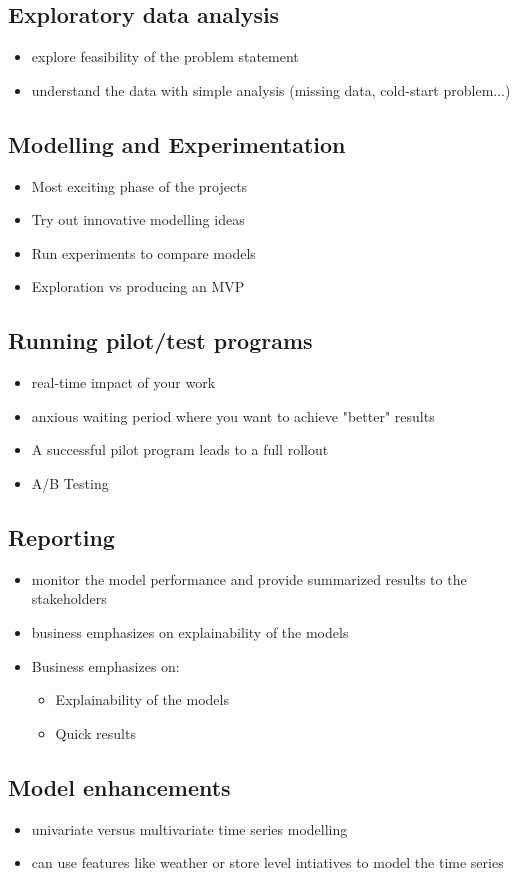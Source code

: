 \documentclass[11pt]{article}
\theoremstyle{definition}
\begin{document}
\subsection{Exploratory data analysis}
\begin{itemize}
    \item explore feasibility of the problem statement
    \item understand the data with simple analysis (missing data, cold-start problem...)
\end{itemize}

\subsection{Modelling and Experimentation}
\begin{itemize}
    \item Most exciting phase of the projects
    \item Try out innovative modelling ideas
    \item Run experiments to compare models
    \item Exploration vs producing an MVP
\end{itemize}

\subsection{Running pilot/test programs}
\begin{itemize}
    \item real-time impact of your work
    \item anxious waiting period where you want to achieve "better" results
    \item A successful pilot program leads to a full rollout
    \item A/B Testing
\end{itemize}

\subsection{Reporting}
\begin{itemize}
    \item monitor the model performance and provide summarized results to the stakeholders
    \item business emphasizes on explainability of the models
    \item Business emphasizes on:
    \begin{itemize}
        \item Explainability of the models
        \item Quick results
    \end{itemize}
\end{itemize}

\subsection{Model enhancements}
\begin{itemize}
    \item univariate versus multivariate time series modelling
    \item can use features like weather or store level intiatives to model the time series
\end{itemize}
\end{document}
